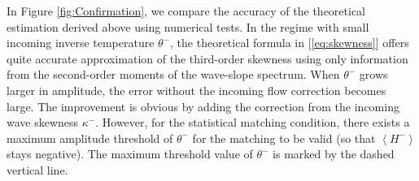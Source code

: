 \documentclass[9pt,twoside,lineno]{pnas-new}
\theoremstyle{plain}
\theoremstyle{plain}
\begin{document}
In Figure \ref{fig:Confirmation}, we compare the accuracy of the
theoretical estimation derived above using numerical tests. In the
regime with small incoming inverse temperature $\theta^{-}$, the
theoretical formula in [\ref{eq:skewness}] offers quite accurate
approximation of the third-order skewness using only information from
the second-order moments of the wave-slope spectrum. When $\theta^{-}$
grows larger in amplitude, the error without the incoming flow correction
becomes large. The improvement is obvious by adding the correction
from the incoming wave skewness $\kappa^{-}$. However, for the statistical
matching condition, there exists a maximum amplitude threshold of
$\theta^{-}$ for the matching to be valid (so that $\left\langle H^{-}\right\rangle $
stays negative). The maximum threshold value of $\theta^{-}$ is marked
by the dashed vertical line.
\end{document}
